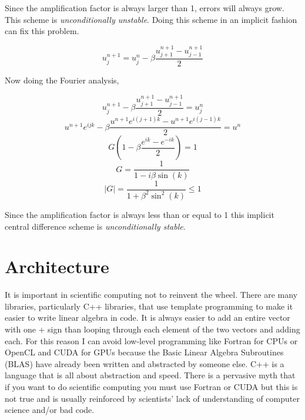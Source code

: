 \documentclass[12pt,upcase]{umlthesis}
\begin{document}
Since the amplification factor is always larger than 1, errors will always grow. This scheme is {\it unconditionally unstable}. Doing this scheme in an implicit fashion can fix this problem.

\begin{equation}\label{eq:implicitcentral}
	u^{n+1}_j = u^n_j - \beta \frac{u^{n+1}_{j+1}-u^{n+1}_{j-1}}{2}
\end{equation}

Now doing the Fourier analysis,

\begin{equation}
	u^{n+1}_j - \beta \frac{u^{n+1}_{j+1}-u^{n+1}_{j-1}}{2} = u^n_j
\end{equation}
\begin{equation}
	u^{n+1}e^{ijk} - \beta \frac{u^{n+1}e^{i(j+1)k}-u^{n+1}e^{i(j-1)k}}{2} = u^n
\end{equation}
\begin{equation}
	G (1 - \beta \frac{e^{ik}-e^{-ik}}{2}) = 1
\end{equation}
\begin{equation}
	G  = \frac{1}{1 - i \beta \sin{(k)}} 
\end{equation}
\begin{equation}
\lvert G \rvert = \frac{1}{1+\beta^2 \sin^2{(k)}} \leq 1
\end{equation}

Since the amplification factor is always less than or equal to 1 this implicit central difference scheme is {\it unconditionally stable}.

\section{Architecture}\label{sec:architecture}

It is important in scientific computing not to reinvent the wheel. There are many libraries, particularly C++ libraries, that use template programming to make it easier to write linear algebra in code. It is always easier to add an entire vector with one + sign than looping through each element of the two vectors and adding each. For this reason I can avoid low-level programming like Fortran for CPUs or OpenCL and CUDA for GPUs because the Basic Linear Algebra Subroutines (BLAS) have already been written and abstracted by someone else. C++ is a language that is all about abstraction and speed. There is a pervasive myth that if you want to do scientific computing you must use Fortran or CUDA but this is not true and is usually reinforced by scientists' lack of understanding of computer science and/or bad code.
\end{document}
